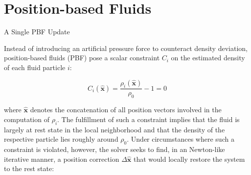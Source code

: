 \documentclass[
	11pt, 
	DIV10,
	ngerman,
	a4paper, 
	oneside, 
	headings=normal, 
	captions=tableheading,
	final, 
	numbers=noenddot
]{scrartcl}
\begin{document}
\section{Position-based Fluids}
\label{sec3}

\large
\begin{algorithm}
	\DontPrintSemicolon
	\SetAlgoLined
	\caption{\label{alg3} A Single PBF Update}
\end{algorithm}
\normalsize

Instead of introducing an artificial pressure force to counteract density deviation, position-based fluids (PBF) pose a scalar constraint $ C_{i} $ on the estimated density of each fluid particle $ i $:

\begin{equation}
	\label{eq20}
	C_{i}(\hat{\boldsymbol{x}}) = \frac{\rho_{i}(\hat{\boldsymbol{x}})}{\rho_{0}} - 1 = 0
\end{equation}

where $ \hat{\boldsymbol{x}} $ denotes the concatenation of all position vectors involved in the computation of $ \rho_{i} $. The fulfillment of such a constraint implies that the fluid is largely at rest state in the local neighborhood and that the density of the respective particle lies roughly around $ \rho_{0} $. Under circumstances where such a constraint is violated, however, the solver seeks to find, in an Newton-like iterative manner, a position correction $ \Delta \hat{\boldsymbol{x}} $ that would locally restore the system to the rest state:
\end{document}
